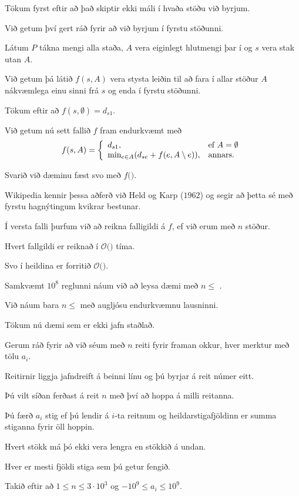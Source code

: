 {
	{
		\item<1-> Tökum fyrst eftir að það skiptir ekki máli í hvaða stöðu við byrjum.
		\item<2-> Við getum því gert ráð fyrir að við byrjum í fyrstu stöðunni.
		\item<3-> Látum $P$ tákna mengi alla staða, $A$ vera eiginlegt hlutmengi þar í og $s$ vera stak utan $A$.
		\item<4-> Við getum þá látið $f(s, A)$ vera stysta leiðin til að fara í allar stöður $A$ nákvæmlega einu sinni frá $s$ og enda í fyrstu stöðunni.
		\item<5-> Tökum eftir að $f(s, \emptyset) = d_{s1}$.
		\item<6-> Við getum nú sett fallið $f$ fram endurkvæmt með
		\[
			f(s, A) = 
			\left \{
			\env{array}
			{
				{l l}
				d_{s1}, & \text{ef $A = \emptyset$}\\
				\text{min}_{e \in A} (d_{se} + f(e, A \setminus e)), & \text{annars}.
			}
			\right .
		\]
		\item<7-> Svarið við dæminu fæst svo með $f($\onslide<8->{$1, P \setminus \{1\}$}$)$.
	}
}

{
	{
		\item<1-> Wikipedia kennir þessa aðferð við Held og Karp ($1962$) og segir að þetta sé með fyrstu hagnýtingum kvikrar bestunar.
		\item<2-> Í versta falli þurfum við að reikna  falligildi á $f$, ef við erum með $n$ stöður.
		\item<4-> Hvert fallgildi er reiknað í $\mathcal{O}($$)$ tíma.
		\item<6-> Svo í heildina er forritið $\mathcal{O}($\onslide<7->{$n^2 \cdot 2^n$}$)$.
		\item<8-> Samkvæmt $10^8$ reglunni náum við að leysa dæmi með $n \leq$ \onslide<9->{$18$}.
		\item<10-> Við náum bara $n \leq$  með augljósu endurkvæmnu lausninni.
	}
}

{
}

{
	{
		\item<1-> Tökum nú dæmi sem er ekki jafn staðlað.
		\item<2-> Gerum ráð fyrir að við séum með $n$ reiti fyrir framan okkur, hver merktur með tölu $a_i$.
		\item<3-> Reitirnir liggja jafndreift á beinni línu og þú byrjar á reit númer eitt.
		\item<4-> Þú vilt síðan ferðast á reit $n$ með því að hoppa á milli reitanna.
		\item<5-> Þú færð $a_i$ stig ef þú lendir á $i$-ta reitnum og heildarstigafjöldinn er summa stiganna fyrir öll hoppin.
		\item<6-> Hvert stökk má þó ekki vera lengra en stökkið á undan.
		\item<7-> Hver er mesti fjöldi stiga sem þú getur fengið.
		\item<8-> Takið eftir að $1 \leq n \leq 3 \cdot 10^3$ og $-10^9 \leq a_i \leq 10^9$.
	}
}

